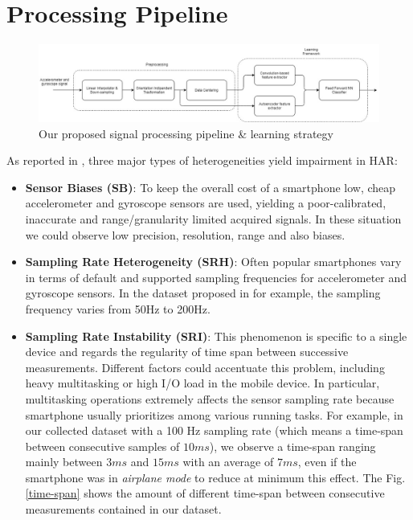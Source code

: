 
\newcommand*{\x}{\boldsymbol{x}}
\newcommand*{\y}{\boldsymbol{y}}
\newcommand*{\z}{\boldsymbol{z}}
\newcommand*{\xm}{\bar{\x}}

\section{Processing Pipeline}
\label{sec:processing-pipeline}

\begin{figure}[h]
	\centering
	\includegraphics[width=1\textwidth]{images/processing_pipeline.jpg}
	\caption{Our proposed signal processing pipeline \& learning strategy}
	\label{fig:processing-pipeline}
\end{figure}

As reported in \cite{stisen2015smart}, three major types of heterogeneities yield impairment in HAR:
\begin{itemize}
	\item \textbf{Sensor Biases (SB)}: To keep the overall cost of a smartphone low, cheap accelerometer and gyroscope sensors are used, yielding a poor-calibrated, inaccurate and range/granularity limited acquired signals. In these situation we could observe low precision, resolution, range and also biases.
	\item \textbf{Sampling Rate Heterogeneity (SRH)}: Often popular smartphones vary in terms of default and supported sampling frequencies for accelerometer and gyroscope sensors. In the dataset proposed in \cite{stisen2015smart} for example, the sampling frequency varies from 50Hz to 200Hz.
	\item \textbf{Sampling Rate Instability (SRI)}: This phenomenon is specific to a single device and regards the regularity of time span between successive measurements. Different factors could accentuate this problem, including heavy multitasking or high I/O load in the mobile device. In particular, multitasking operations extremely affects the sensor sampling rate because smartphone usually prioritizes among various running tasks. For example, in our collected dataset with a 100 Hz sampling rate (which means a time-span between consecutive samples of $10ms$), we observe a time-span ranging mainly between $3ms$ and $15ms$ with an average of $7ms$, even if the smartphone was in \textit{airplane mode} to reduce at minimum this effect. The Fig. \ref{time-span} shows the amount of different time-span between consecutive measurements contained in our dataset.
\end{itemize}

